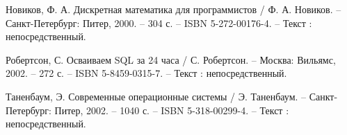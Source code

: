 \begin{thebibliography}{9}
    Новиков, Ф. А. Дискретная математика для программистов / Ф. А. Новиков. – Санкт-Петербург: Питер, 2000. – 304 с. – ISBN 5-272-00176-4. – Текст : непосредственный.
    
    Робертсон, С. Осваиваем SQL за 24 часа / С. Робертсон. – Москва: Вильямс, 2002. – 272 с. – ISBN 5-8459-0315-7. – Текст : непосредственный.
    
    Таненбаум, Э. Современные операционные системы / Э. Таненбаум. – Санкт-Петербург: Питер, 2002. – 1040 с. – ISBN 5-318-00299-4. – Текст : непосредственный.
    
\end{thebibliography}

